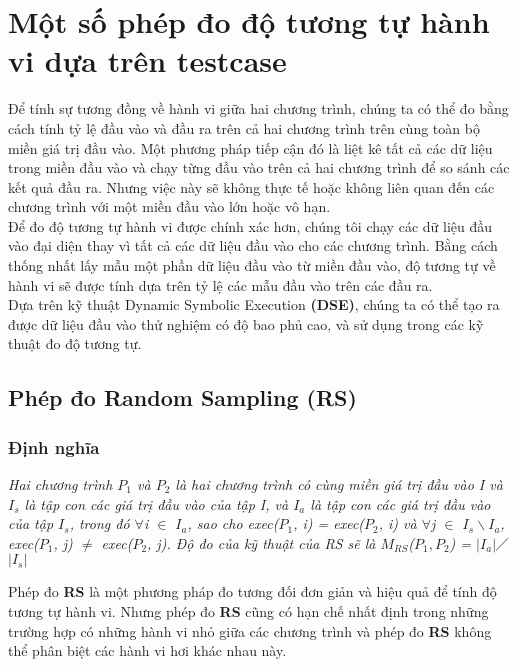 \section{Một số phép đo độ tương tự hành vi dựa trên testcase}
Để tính sự tương đồng về hành vi giữa hai chương trình, chúng ta có thể đo bằng cách tính tỷ lệ đầu vào và đầu ra trên cả hai chương trình trên cùng toàn bộ miền giá trị đầu vào. Một phương pháp tiếp cận đó là liệt kê tất cả các dữ liệu trong miền đầu vào và chạy từng đầu vào trên cả hai chương trình để so sánh các kết quả đầu ra. Nhưng việc này sẽ không thực tế hoặc không liên quan đến các chương trình với một miền đầu vào lớn hoặc vô hạn. \\
	
Để đo độ tương tự hành vi được chính xác hơn, chúng tôi chạy các dữ liệu đầu vào đại diện thay vì tất cả các dữ liệu đầu vào cho các chương trình. Bằng cách thống nhất lấy mẫu một phần dữ liệu đầu vào từ miền đầu vào, độ tương tự về hành vi sẽ được tính dựa trên tỷ lệ các mẫu đầu vào trên các đầu ra. \\
	
Dựa trên kỹ thuật Dynamic Symbolic Execution \textbf{(DSE)}, chúng ta có thể tạo ra được dữ liệu đầu vào thử nghiệm có độ bao phủ cao, và sử dụng trong các kỹ thuật đo độ tương tự. \\

\subsection{Phép đo Random Sampling (RS)}
	\subsubsection{Định nghĩa}
	\textit{Hai chương trình $P_{1}$ và $P_{2}$ là hai chương trình có cùng miền giá trị đầu vào I và $I_{s}$ là tập con các giá trị đầu vào của tập I, và  $I_{a}$ là tập con các giá trị đầu vào của tập $I_{s}$, trong đó $\forall$i $\in$ $I_{a}$, sao cho exec($P_{1}$, i) = exec($P_{2}$, i) và $\forall$j $\in$ $I_{s} \backslash I_{a}$, exec($P_{1}$, j) $\neq$ exec($P_{2}$, j). Độ đo của kỹ thuật của RS sẽ là $M_{RS}$($P_{1},P_{2}$) = $\left|I_{a}\right|$$\diagup$$\left|I_{s}\right|$}
	
	Phép đo \textbf{RS} là một phương pháp đo tương đối đơn giản và hiệu quả để tính độ tương tự hành vi. Nhưng phép đo \textbf{RS} cũng có hạn chế nhất định trong những trường hợp có những hành vi nhỏ giữa các chương trình và phép đo \textbf{RS } không thể phân biệt các hành vi hơi khác nhau này.\\
	
